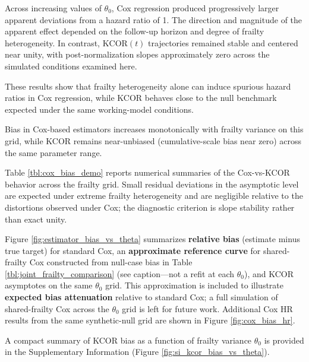 \documentclass[
]{article}
\begin{document}
Across increasing values of \(\theta_0\), Cox regression produced
progressively larger apparent deviations from a hazard ratio of 1. The
direction and magnitude of the apparent effect depended on the follow-up
horizon and degree of frailty heterogeneity. In contrast,
\(\mathrm{KCOR}(t)\) trajectories remained stable and centered near
unity, with post-normalization slopes approximately zero across the
simulated conditions examined here.

These results show that frailty heterogeneity alone can induce spurious
hazard ratios in Cox regression, while KCOR behaves close to the null
benchmark expected under the same working-model conditions.

Bias in Cox-based estimators increases monotonically with frailty
variance on this grid, while KCOR remains near-unbiased
(cumulative-scale bias near zero) across the same parameter range.

Table \ref{tbl:cox_bias_demo} reports numerical summaries of the
Cox-vs-KCOR behavior across the frailty grid. Small residual deviations
in the asymptotic level are expected under extreme frailty heterogeneity
and are negligible relative to the distortions observed under Cox; the
diagnostic criterion is slope stability rather than exact unity.

Figure \ref{fig:estimator_bias_vs_theta} summarizes \textbf{relative
bias} (estimate minus true target) for standard Cox, an
\textbf{approximate reference curve} for shared-frailty Cox constructed
from null-case bias in Table \ref{tbl:joint_frailty_comparison} (see
caption---not a refit at each \(\theta_0\)), and KCOR asymptotes on the
same \(\theta_0\) grid. This approximation is included to illustrate
\textbf{expected bias attenuation} relative to standard Cox; a full
simulation of shared-frailty Cox across the \(\theta_0\) grid is left
for future work. Additional Cox HR results from the same synthetic-null
grid are shown in Figure \ref{fig:cox_bias_hr}.

A compact summary of KCOR bias as a function of frailty variance
\(\theta_0\) is provided in the Supplementary Information (Figure
\ref{fig:si_kcor_bias_vs_theta}).
\end{document}
